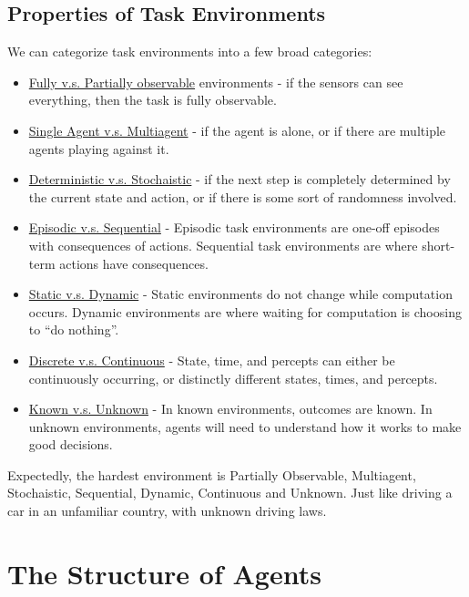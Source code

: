 \subsection{Properties of Task Environments} %
\label{sub:properties_of_task_environments}

We can categorize task environments into a few broad categories:
\begin{itemize}
    \item \uline{Fully v.s. Partially observable} environments - if the sensors
    can see everything, then the task is fully observable.
    \item \uline{Single Agent v.s. Multiagent} - if the agent is alone, or if
    there are multiple agents playing against it.
    \item \uline{Deterministic v.s. Stochaistic} - if the next step is
    completely determined by the current state and action, or if there is some
    sort of randomness involved.
    \item \uline{Episodic v.s. Sequential} -
    Episodic task environments are one-off episodes with consequences of actions.
    Sequential task environments are where short-term actions have consequences.
    \item \uline{Static v.s. Dynamic} -
    Static environments do not change while computation occurs.
    Dynamic environments  are where waiting for computation is choosing to
    ``do nothing''.
    \item \uline{Discrete v.s. Continuous} -
    State, time, and percepts can either be continuously occurring, or
    distinctly different states, times, and percepts.
    \item \uline{Known v.s. Unknown} -
    In known environments, outcomes are known.
    In unknown environments, agents will need to understand how it works to make
    good decisions.
\end{itemize}

Expectedly, the hardest environment is Partially Observable, Multiagent,
Stochaistic, Sequential, Dynamic, Continuous and Unknown.
Just like driving a car in an unfamiliar country, with unknown driving laws.



\section{The Structure of Agents} %
\label{sec:the_structure_of_agents}

